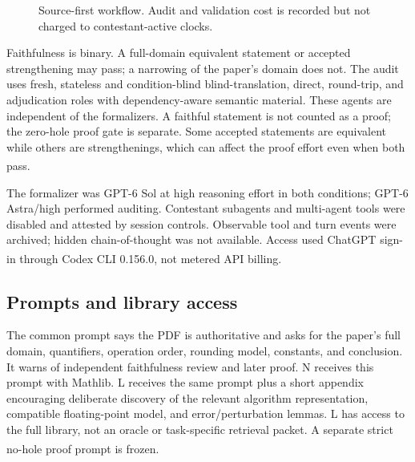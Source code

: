 \documentclass[10pt,a4paper]{article}
\newcommand{\src}[1]{\textsuperscript{\cite{#1}}}
\begin{document}
\begin{figure}[ht]\centering\small
{}
\caption{Source-first workflow. Audit and validation cost is recorded but not
charged to contestant-active clocks.\cite{protocol,metrics}}
\label{fig:flow}
\end{figure}

Faithfulness is binary. A full-domain equivalent statement or accepted
strengthening may pass; a narrowing of the paper's domain does not. The audit
uses fresh, stateless and condition-blind blind-translation, direct,
round-trip, and adjudication roles with dependency-aware semantic material.
These agents are independent of the formalizers. A faithful statement is not
counted as a proof; the zero-hole proof gate is separate. Some accepted
statements are equivalent while others are strengthenings, which can affect
the proof effort even when both pass.\src{protocol,auditprompts,taskledger}

The formalizer was GPT-6 Sol at high reasoning effort in both conditions;
GPT-6 Astra/high performed auditing. Contestant subagents and multi-agent
tools were disabled and attested by session controls. Observable tool and
turn events were archived; hidden chain-of-thought was not available.
Access used ChatGPT sign-in through Codex CLI 0.156.0, not metered API
billing.\src{metrics,evidence,deployment}

\subsection{Prompts and library access}

The common prompt says the PDF is authoritative and asks for the paper's
full domain, quantifiers, operation order, rounding model, constants, and
conclusion. It warns of independent faithfulness review and later proof.
N receives this prompt with Mathlib. L receives the same prompt plus a short
appendix encouraging deliberate discovery of the relevant algorithm
representation, compatible floating-point model, and error/perturbation
lemmas. L has access to the full library, not an oracle or task-specific
retrieval packet. A separate strict no-hole proof prompt is frozen.\src{prompts,proofprompt}
\end{document}

